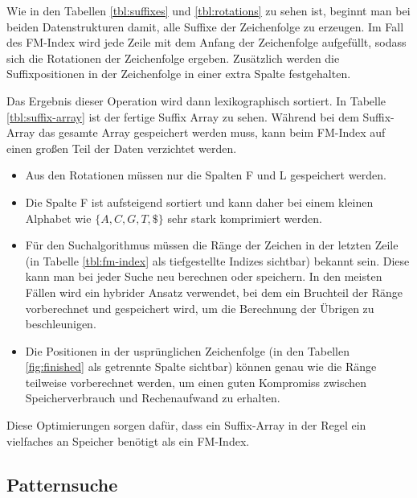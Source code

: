 Wie in den Tabellen \ref{tbl:suffixes} und \ref{tbl:rotations} zu sehen ist, beginnt man bei beiden Datenstrukturen damit, alle Suffixe der Zeichenfolge zu erzeugen.
Im Fall des FM-Index wird jede Zeile mit dem Anfang der Zeichenfolge aufgefüllt, sodass sich die Rotationen der Zeichenfolge ergeben.
Zusätzlich werden die Suffixpositionen in der Zeichenfolge in einer extra Spalte festgehalten.

Das Ergebnis dieser Operation wird dann lexikographisch sortiert. In Tabelle \ref{tbl:suffix-array} ist der fertige Suffix Array zu sehen.
Während bei dem Suffix-Array das gesamte Array gespeichert werden muss, kann beim FM-Index auf einen großen Teil der Daten verzichtet werden.

\begin{itemize}
	\item Aus den Rotationen müssen nur die Spalten F und L gespeichert werden.
	\item Die Spalte F ist aufsteigend sortiert und kann daher bei einem kleinen Alphabet wie $\{A, C, G, T, \$\}$ sehr stark komprimiert werden.
	\item Für den Suchalgorithmus müssen die Ränge der Zeichen in der letzten Zeile (in Tabelle \ref{tbl:fm-index} als tiefgestellte Indizes sichtbar) bekannt sein.
		Diese kann man bei jeder Suche neu berechnen oder speichern.
		In den meisten Fällen wird ein hybrider Ansatz verwendet, bei dem ein Bruchteil der Ränge vorberechnet und gespeichert wird, um die Berechnung der Übrigen zu beschleunigen.
	\item Die Positionen in der usprünglichen Zeichenfolge (in den Tabellen \ref{fig:finished} als getrennte Spalte sichtbar) können genau wie die Ränge teilweise vorberechnet werden, um einen guten Kompromiss zwischen Speicherverbrauch und Rechenaufwand zu erhalten.
\end{itemize}

Diese Optimierungen sorgen dafür, dass ein Suffix-Array in der Regel ein vielfaches an Speicher benötigt als ein FM-Index.

\subsection{Patternsuche}
\label{subsec:patternsearch}

